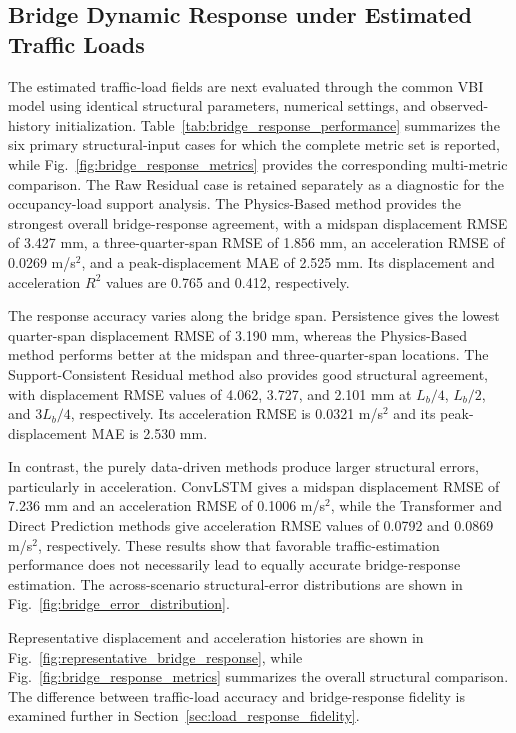 \documentclass[journal]{IEEEtran}
\begin{document}
\subsection{Bridge Dynamic Response under Estimated Traffic Loads}
\label{sec:bridge_response_results}

The estimated traffic-load fields are next evaluated through the common VBI model using identical structural parameters, numerical settings, and observed-history initialization. Table~\ref{tab:bridge_response_performance} summarizes the six primary structural-input cases for which the complete metric set is reported, while Fig.~\ref{fig:bridge_response_metrics} provides the corresponding multi-metric comparison. The Raw Residual case is retained separately as a diagnostic for the occupancy-load support analysis. The Physics-Based method provides the strongest overall bridge-response agreement, with a midspan displacement RMSE of 3.427 mm, a three-quarter-span RMSE of 1.856 mm, an acceleration RMSE of 0.0269 m/s$^2$, and a peak-displacement MAE of 2.525 mm. Its displacement and acceleration $R^2$ values are 0.765 and 0.412, respectively.

The response accuracy varies along the bridge span. Persistence gives the lowest quarter-span displacement RMSE of 3.190 mm, whereas the Physics-Based method performs better at the midspan and three-quarter-span locations. The Support-Consistent Residual method also provides good structural agreement, with displacement RMSE values of 4.062, 3.727, and 2.101 mm at $L_b/4$, $L_b/2$, and $3L_b/4$, respectively. Its acceleration RMSE is 0.0321 m/s$^2$ and its peak-displacement MAE is 2.530 mm.

In contrast, the purely data-driven methods produce larger structural errors, particularly in acceleration. ConvLSTM gives a midspan displacement RMSE of 7.236 mm and an acceleration RMSE of 0.1006 m/s$^2$, while the Transformer and Direct Prediction methods give acceleration RMSE values of 0.0792 and 0.0869 m/s$^2$, respectively. These results show that favorable traffic-estimation performance does not necessarily lead to equally accurate bridge-response estimation. The across-scenario structural-error distributions are shown in Fig.~\ref{fig:bridge_error_distribution}.

Representative displacement and acceleration histories are shown in Fig.~\ref{fig:representative_bridge_response}, while Fig.~\ref{fig:bridge_response_metrics} summarizes the overall structural comparison. The difference between traffic-load accuracy and bridge-response fidelity is examined further in Section~\ref{sec:load_response_fidelity}.
\end{document}
